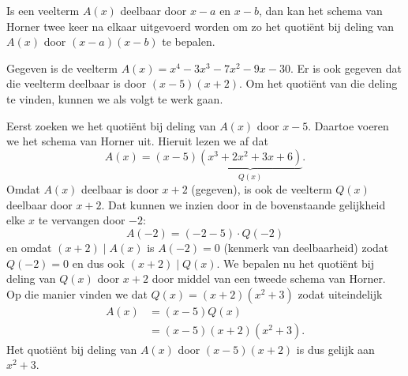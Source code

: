 \documentclass{ximera}
\begin{document}

Is een veelterm $A(x)$ deelbaar door $x-a$ en $x-b$, dan kan het schema van Horner twee keer na elkaar uitgevoerd worden om zo het quoti\"ent bij deling van $A(x)$ door $(x-a)(x-b)$ te bepalen. 

\begin{example}
Gegeven is de veelterm $A(x) = x^4 - 3x^3 - 7x^2 - 9 x - 30$. Er is ook gegeven dat die veelterm deelbaar is door $(x-5)(x+2)$. Om het quoti\"ent van die deling te vinden, kunnen we als volgt te werk gaan.

Eerst zoeken we het quoti\"ent bij deling van $A(x)$ door $x-5$. Daartoe voeren we het schema van Horner uit.
\renewcommand{\kolbreed}{\widthof{$-30$}}
Hieruit lezen we af dat
\[
A(x) = (x-5)\underbrace{(x^3 + 2x^2 + 3x + 6)}_{Q(x)}.
\] 
Omdat $A(x)$ deelbaar is door $x+2$ (gegeven), is ook de veelterm $Q(x)$ deelbaar door $x+2$. Dat kunnen we inzien door in de bovenstaande gelijkheid elke $x$ te vervangen door $-2$:
\[
A(-2) = (-2-5)\cdot Q(-2)
\]
en omdat $(x+2) \mid A(x)$ is $A(-2) = 0$ (kenmerk van deelbaarheid) zodat $Q(-2) = 0$ en dus ook $(x+2) \mid Q(x)$. We bepalen nu het quoti\"ent bij deling van $Q(x)$ door $x+2$ door middel van een tweede schema van Horner.
\renewcommand{\kolbreed}{\widthof{$-6$}}
Op die manier vinden we dat $Q(x) = (x+2)(x^2+3)$ zodat uiteindelijk
\begin{align*}
A(x) 
& = (x-5)Q(x) \\
& = (x-5)(x+2)(x^2+3).
\end{align*}
Het quoti\"ent bij deling van $A(x)$ door $(x-5)(x+2)$ is dus gelijk aan $x^2+3$. 
\end{example}
\end{document}
